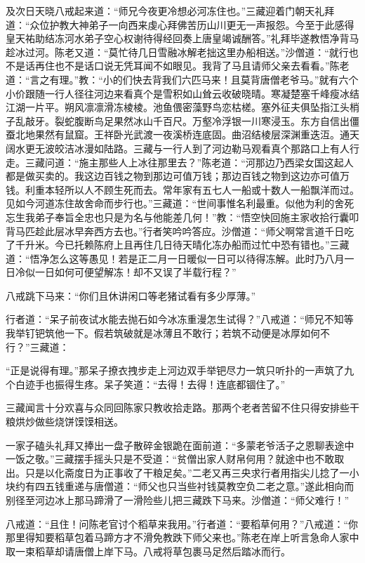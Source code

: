 \documentclass[12pt,UTF8]{ctexbook}
\begin{document}
及次日天晓八戒起来道：“师兄今夜更冷想必河冻住也。”三藏迎着门朝天礼拜道：“众位护教大神弟子一向西来虔心拜佛苦历山川更无一声报怨。今至于此感得皇天祐助结冻河水弟子空心权谢待得经回奏上唐皇竭诚酬答。”礼拜毕遂教悟净背马趁冰过河。陈老又道：“莫忙待几日雪融冰解老拙这里办船相送。”沙僧道：“就行也不是话再住也不是话口说无凭耳闻不如眼见。我背了马且请师父亲去看看。”陈老道：“言之有理。”教：“小的们快去背我们六匹马来！且莫背唐僧老爷马。”就有六个小价跟随一行人径往河边来看真个是雪积如山耸云收破晓晴。寒凝楚塞千峰瘦冰结江湖一片平。朔风凛凛滑冻棱棱。池鱼偎密藻野鸟恋枯槎。塞外征夫俱坠指江头梢子乱敲牙。裂蛇腹断鸟足果然冰山千百尺。万壑冷浮银一川寒浸玉。东方自信出僵蚕北地果然有鼠窟。王祥卧光武渡一夜溪桥连底固。曲沼结棱层深渊重迭沍。通天阔水更无波皎洁冰漫如陆路。三藏与一行人到了河边勒马观看真个那路口上有人行走。三藏问道：“施主那些人上冰往那里去？”陈老道：“河那边乃西梁女国这起人都是做买卖的。我这边百钱之物到那边可值万钱；那边百钱之物到这边亦可值万钱。利重本轻所以人不顾生死而去。常年家有五七人一船或十数人一船飘洋而过。见如今河道冻住故舍命而步行也。”三藏道：“世间事惟名利最重。似他为利的舍死忘生我弟子奉旨全忠也只是为名与他能差几何！”教：“悟空快回施主家收拾行囊叩背马匹趁此层冰早奔西方去也。”行者笑吟吟答应。沙僧道：“师父啊常言道千日吃了千升米。今已托赖陈府上且再住几日待天晴化冻办船而过忙中恐有错也。”三藏道：“悟净怎么这等愚见！若是正二月一日暖似一日可以待得冻解。此时乃八月一日冷似一日如何可便望解冻！却不又误了半载行程？”

八戒跳下马来：“你们且休讲闲口等老猪试看有多少厚薄。”

行者道：“呆子前夜试水能去抛石如今冰冻重漫怎生试得？”八戒道：“师兄不知等我举钉钯筑他一下。假若筑破就是冰薄且不敢行；若筑不动便是冰厚如何不行？”三藏道：

“正是说得有理。”那呆子撩衣拽步走上河边双手举钯尽力一筑只听扑的一声筑了九个白迹手也振得生疼。呆子笑道：“去得！去得！连底都锢住了。”

三藏闻言十分欢喜与众同回陈家只教收拾走路。那两个老者苦留不住只得安排些干粮烘炒做些烧饼馍馍相送。

一家子磕头礼拜又捧出一盘子散碎金银跪在面前道：“多蒙老爷活子之恩聊表途中一饭之敬。”三藏摆手摇头只是不受道：“贫僧出家人财帛何用？就途中也不敢取出。只是以化斋度日为正事收了干粮足矣。”二老又再三央求行者用指尖儿捻了一小块约有四五钱重递与唐僧道：“师父也只当些衬钱莫教空负二老之意。”遂此相向而别径至河边冰上那马蹄滑了一滑险些儿把三藏跌下马来。沙僧道：“师父难行！”

八戒道：“且住！问陈老官讨个稻草来我用。”行者道：“要稻草何用？”八戒道：“你那里得知要稻草包着马蹄方才不滑免教跌下师父来也。”陈老在岸上听言急命人家中取一束稻草却请唐僧上岸下马。八戒将草包裹马足然后踏冰而行。
\end{document}
